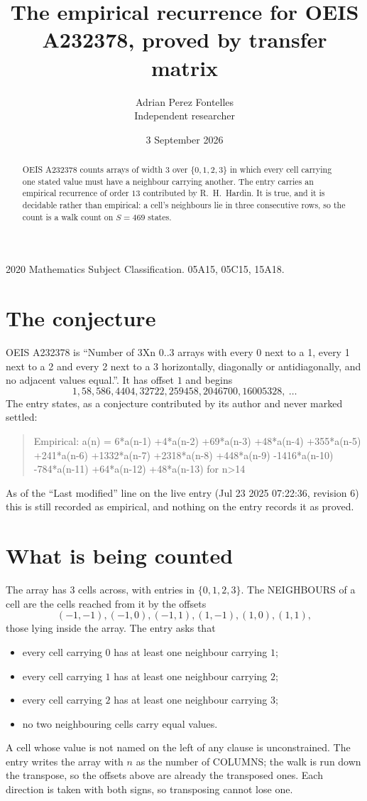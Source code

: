 \documentclass[11pt,a4paper]{article}
\title{The empirical recurrence for OEIS A232378, proved by transfer matrix}
\author{Adrian Perez Fontelles\\ \small Independent researcher}
\date{3 September 2026}
\theoremstyle{plain}
\theoremstyle{definition}
\begin{document}
\maketitle

\begin{abstract}
OEIS A232378 counts arrays of width $3$ over $\{0,1,2,3\}$ in which every cell carrying one stated
value must have a neighbour carrying another. The entry carries an empirical recurrence of
order $13$ contributed by R.~H.~Hardin. It is true, and it is decidable rather than
empirical: a cell's neighbours lie in three consecutive rows, so the count is a walk count on
$S=469$ states.
\end{abstract}

\noindent\small 2020 Mathematics Subject Classification. 05A15, 05C15, 15A18.\normalsize

\section{The conjecture}

OEIS A232378 is ``Number of 3Xn 0..3 arrays with every 0 next to a 1, every 1 next to a 2 and every 2 next to a 3 horizontally, diagonally or antidiagonally, and no adjacent values equal.''. It has offset $1$ and begins
\[
1, 58, 586, 4404, 32722, 259458, 2046700, 16005328,\ \dots
\]
The entry states, as a conjecture contributed by its author and never marked settled:
\begin{quote}
Empirical: a(n) = 6*a(n-1) +4*a(n-2) +69*a(n-3) +48*a(n-4) +355*a(n-5) +241*a(n-6) +1332*a(n-7) +2318*a(n-8) +448*a(n-9) -1416*a(n-10) -784*a(n-11) +64*a(n-12) +48*a(n-13) for n>14
\end{quote}
As of the ``Last modified'' line on the live entry (Jul 23 2025 07:22:36, revision 6) this is still
recorded as empirical, and nothing on the entry records it as proved.

\section{What is being counted}

The array has $3$ cells across, with entries in $\{0,1,2,3\}$. The NEIGHBOURS of a cell are the
cells reached from it by the offsets
\[
(-1,-1), (-1,0), (-1,1), (1,-1), (1,0), (1,1),
\]
those lying inside the array. The entry asks that
\begin{itemize}
\item every cell carrying $0$ has at least one neighbour carrying $1$;
\item every cell carrying $1$ has at least one neighbour carrying $2$;
\item every cell carrying $2$ has at least one neighbour carrying $3$;
\item no two neighbouring cells carry equal values.
\end{itemize}
A cell whose value is not named on the left of any clause is unconstrained. The entry writes the array with $n$ as the number of COLUMNS; the walk is run down the transpose, so the offsets above are already the transposed ones. Each direction is taken with both signs, so transposing cannot lose one.
\end{document}
